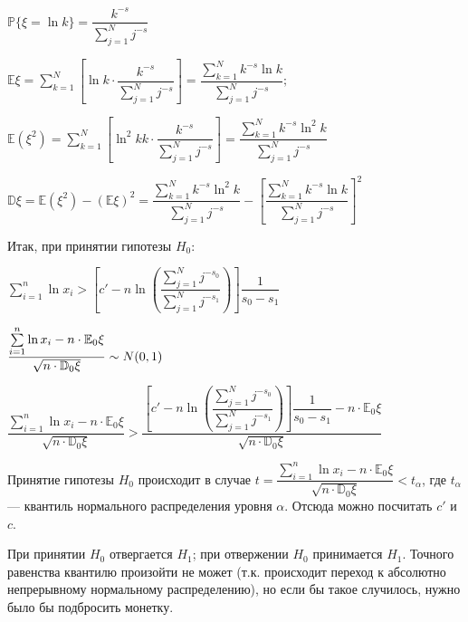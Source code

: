 \documentclass[11pt]{article}
\def\sim{\mathchar"3218\nobreak\discretionary{}{\usefont{OMS}{cmsy}{m}{n}\char24}{}}
\begin{document}
\(\mathbb{P}\{\xi=\ln{k}\}=\dfrac{k^{-s}}{\sum\limits_{j=1}^{N}j^{-s}}\)

\(\mathbb{E}\xi= \sum\limits_{k=1}^{N}\left[\ln{k}\cdot\dfrac{k^{-s}}{\sum\limits_{j=1}^{N}j^{-s}}\right]= \dfrac{\sum\limits_{k=1}^{N}k^{-s}\ln{k}}{\sum\limits_{j=1}^{N}j^{-s}};\)

\(\mathbb{E}\left(\xi^2\right)= \sum\limits_{k=1}^{N}\left[\ln^2{k}k\cdot\dfrac{k^{-s}}{\sum\limits_{j=1}^{N}j^{-s}}\right]= \dfrac{\sum\limits_{k=1}^{N}k^{-s}\ln^2{k}}{\sum\limits_{j=1}^{N}j^{-s}}\)

\(\mathbb{D}\xi= \mathbb{E}\left(\xi^2\right)-\left(\mathbb{E}\xi\right)^2= \dfrac{\sum\limits_{k=1}^{N}k^{-s}\ln^2{k}}{\sum\limits_{j=1}^{N}j^{-s}}-\left[\dfrac{\sum\limits_{k=1}^{N}k^{-s}\ln{k}}{\sum\limits_{j=1}^{N}j^{-s}}\right]^2\)

    Итак, при принятии гипотезы \(H_0\):

\(\sum\limits_{i=1}^{n}\ln{x_i}>\left[c'-n\ln\left(\dfrac{\sum\limits_{j=1}^{N}j^{-s_0}}{\sum\limits_{j=1}^{N}j^{-s_1}}\right)\right]\dfrac{1}{s_0-s_1}\)

\(\dfrac{\sum\limits_{i=1}^{n}\ln{x_i}-n\cdot\mathbb{E}_0 \xi}{\sqrt{n\cdot\mathbb{D}_0 \xi}}\sim N(0,1)\)

\(\dfrac{\sum\limits_{i=1}^{n}\ln{x_i}-n\cdot\mathbb{E}_0 \xi}{\sqrt{n\cdot\mathbb{D}_0 \xi}}> \dfrac{\left[c'-n\ln\left(\dfrac{\sum\limits_{j=1}^{N}j^{-s_0}}{\sum\limits_{j=1}^{N}j^{-s_1}}\right)\right]\dfrac{1}{s_0-s_1}-n\cdot\mathbb{E}_0 \xi}{\sqrt{n\cdot\mathbb{D}_0 \xi}}\)

Принятие гипотезы \(H_0\) происходит в случае
\(t=\dfrac{\sum\limits_{i=1}^{n}\ln{x_i}-n\cdot\mathbb{E}_0 \xi}{\sqrt{n\cdot\mathbb{D}_0 \xi}}<t_{\alpha}\),
где \(t_{\alpha}\) --- квантиль нормального распределения уровня
\(\alpha\). Отсюда можно посчитать \(c'\) и \(c\).

При принятии \(H_0\) отвергается \(H_1\); при отвержении \(H_0\)
принимается \(H_1\). Точного равенства квантилю произойти не может (т.к.
происходит переход к абсолютно непрерывному нормальному распределению),
но если бы такое случилось, нужно было бы подбросить монетку.
\end{document}
